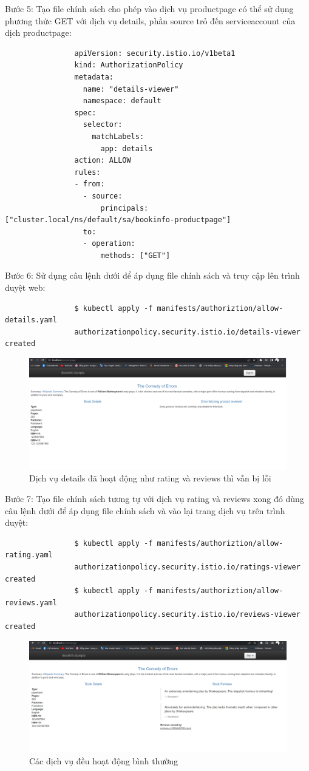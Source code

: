 \documentclass[12pt,a4paper]{report}
\begin{document}
{{				Bước 5: Tạo file chính sách cho phép vào dịch vụ productpage có thể sử dụng phương thức GET với dịch vụ details, phần source trỏ đến serviceaccount của dịch productpage:
				\begin{lstlisting}
				apiVersion: security.istio.io/v1beta1
				kind: AuthorizationPolicy
				metadata:
				  name: "details-viewer"
				  namespace: default
				spec:
				  selector:
				    matchLabels:
				      app: details
				action: ALLOW
				rules:
				- from:
				  - source:
				      principals: ["cluster.local/ns/default/sa/bookinfo-productpage"]
				  to:
				  - operation:
				      methods: ["GET"]
				\end{lstlisting}
	
			 	Bước 6: Sử dụng câu lệnh dưới để áp dụng file chính sách và truy cập lên trình duyệt web:
			 	\begin{lstlisting}
			 	$ kubectl apply -f manifests/authoriztion/allow-details.yaml 
			 	authorizationpolicy.security.istio.io/details-viewer created
			 	\end{lstlisting}

				\begin{figure}[h]
					\centering
					\includegraphics[width=0.7\linewidth]{Pics/3.3.2-p3}
					\caption{Dịch vụ details đã hoạt động như rating và reviews thì vẫn bị lỗi}
					\label{fig:3}
				\end{figure}

				Bước 7: Tạo file chính sách tương tự với dịch vụ rating và reviews xong đó dùng câu lệnh dưới để áp dụng file chính sách và vào lại trang dịch vụ trên trình duyệt:
				\begin{lstlisting}
				$ kubectl apply -f manifests/authoriztion/allow-rating.yaml 
				authorizationpolicy.security.istio.io/ratings-viewer created
				$ kubectl apply -f manifests/authoriztion/allow-reviews.yaml 
				authorizationpolicy.security.istio.io/reviews-viewer created
				\end{lstlisting}
				\begin{figure}[h]
					\centering
					\includegraphics[width=0.7\linewidth]{Pics/3.3.2-p4}
					\caption{Các dịch vụ đều hoạt động bình thường}
					\label{fig:3}
				\end{figure}
		\pagebreak
}}
\end{document}

